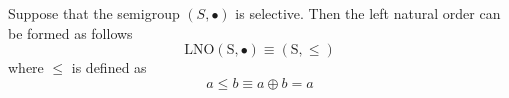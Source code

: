 Suppose that the semigroup $(S , \bullet)$ is selective. Then the left natural order can be formed as follows
\begin{equation*}
\mathrm{LNO(S, \bullet)} \equiv \mathrm{(S , \leq)}
\end{equation*}
where $\leq$ is defined as
\begin{equation*}
a \leq b \equiv a \oplus b = a
\end{equation*}
